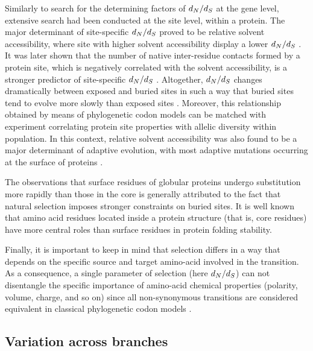 Similarly to search for the determining factors of $d_N / d_S$ at the gene level, extensive search had been conducted at the site level, within a protein.
The major determinant of site-specific $d_N / d_S$ proved to be relative solvent accessibility, where site with higher solvent accessibility display a lower $d_N / d_S$ \citep{Ramsey2011}.
It was later shown that the number of native inter-residue contacts formed by a protein site, which is negatively correlated with the solvent accessibility, is a stronger predictor of site-specific $d_N / d_S$ \citep{Yeh2013}.
Altogether, $d_N / d_S$ changes dramatically between exposed and buried sites in such a way that buried sites tend to evolve more slowly than exposed sites \citep{Echave2016}.
Moreover, this relationship obtained by means of phylogenetic codon models can be matched with experiment correlating protein site properties with allelic diversity within population.
In this context, relative solvent accessibility was also found to be a major determinant of adaptive evolution, with most adaptive mutations occurring at the surface of proteins \citep{Moutinho2019}.

The observations that surface residues of globular proteins undergo \gls{substitution} more rapidly than those in the core is generally attributed to the fact that natural selection imposes stronger constraints on buried sites.
It is well known that amino acid residues located inside a protein structure (that is, core residues) have more central roles than surface residues in protein folding stability.

Finally, it is important to keep in mind that selection differs in a way that depends on the specific source and target amino-acid involved in the transition.
As a consequence, a single parameter of selection (here $d_N / d_S$) can not disentangle the specific importance of amino-acid chemical properties (polarity, volume, charge, and so on) since all non-synonymous transitions are considered equivalent in classical phylogenetic codon models \citep{Dutheil2008}.

\subsection{Variation across branches}

